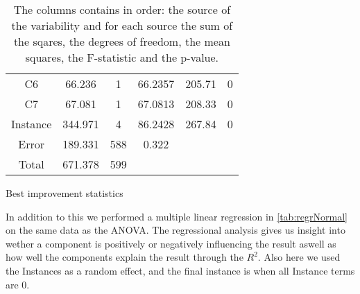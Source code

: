 \documentclass[../main.tex]{subfiles}
\begin{document}
\begin{table}
\begin{adjustbox}{width=\columnwidth,center}
\begin{subtable}{.75\columnwidth}
\begin{tabular}{cccccc}
            C6      & 66.236    & 1 & 66.2357   & 205.71& 0     \\
            C7      & 67.081    & 1 & 67.0813   & 208.33& 0     \\
            Instance& 344.971   & 4 & 86.2428   & 267.84& 0     \\
            Error   & 189.331   &588& 0.322     &       &       \\
            Total   & 671.378   &599&           &       &       \\
            \hline
            \end{tabular}
        \caption{Best improvement statistics}
        \label{tab:anovaBestNormal}
        \end{subtable}
    \end{adjustbox}
    \label{tab:anovaNormal}
    \caption*{The columns contains in order: the source of the variability and for each source the sum of the sqares, the degrees of freedom, the mean squares, the F-statistic and the p-value.}
\end{table}

In addition to this we performed a multiple linear regression in \cref{tab:regrNormal} on the same data as the ANOVA.
The regressional analysis gives us insight into wether a component is positively or negatively influencing the result aswell as how well the components explain the result through the $R^2$.
Also here we used the Instances as a random effect, and the final instance is when all Instance terms are 0.
\end{document}
